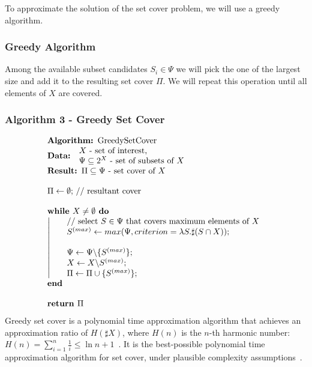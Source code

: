 \documentclass[9pt]{article}
\newcounter{rm}
\begin{document}
To approximate the solution of the set cover problem, we will use a greedy algorithm.

\subsubsection*{Greedy Algorithm}
Among the available subset candidates $S_i \in \Psi$ we will pick the one of the largest size and add it to the resulting set cover $\Pi$. We will repeat this operation until all elements of $X$ are covered. \\

\subsubsection*{Algorithm 3 - Greedy Set Cover}
\[ \begin{array}{l}
\mbox{\textbf{Algorithm: }GreedySetCover}\\
\mbox{\textbf{Data: }}\begin{array}{l}\mbox{$X$ - set of interest,}\\ \mbox{$\Psi \subseteq 2^X$ - set of subsets of $X$}\end{array}\\
\mbox{\textbf{Result: }$\Pi \subseteq \Psi$ - set cover of $X$}\\
\mbox{~}\\
\mbox{$\Pi \leftarrow \emptyset;$ // resultant cover}\\
\mbox{~}\\
\mbox{\textbf{while }$X \neq \emptyset$\textbf{ do}}\\
\left| \indent \begin{array}{l}
\mbox{// select $S \in \Psi$ that covers maximum elements of $X$} \\
\mbox{$S^{(max)} \leftarrow max(\Psi, criterion=\lambda{S}.\sharp{(S\cap{X}}));$} \\
\mbox{~}\\
\mbox{$\Psi \leftarrow \Psi\backslash\{S^{(max)}\};$}\\
\mbox{$X \leftarrow X\backslash{S^{(max)}};$} \\
\mbox{$\Pi \leftarrow \Pi\cup\{S^{(max)}\};$} 
\end{array}\right.\\
\mbox{\textbf{end}}\\
\mbox{~}\\
\mbox{\textbf{return }$\Pi$}
\end{array} \]
Greedy set cover is a polynomial time approximation algorithm that achieves an approximation ratio of $H(\sharp X)$, where $H(n)$ is the $n$-th harmonic number: $H(n) = \sum^n_{i = 1}\frac{1}{i} \leq \ln{n} + 1$~\citep{Chvatal1979}. It is the best-possible polynomial time approximation algorithm for set cover, under plausible complexity assumptions~\citep{Feige1998}. 
\end{document}
